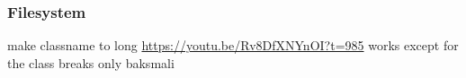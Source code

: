 \subsubsection{Filesystem}\label{subsubsection:counter-reengineering-break-filesystem}
make classname to long\newline
\url{https://youtu.be/Rv8DfXNYnOI?t=985} works except for the class\newline
breaks only baksmali
